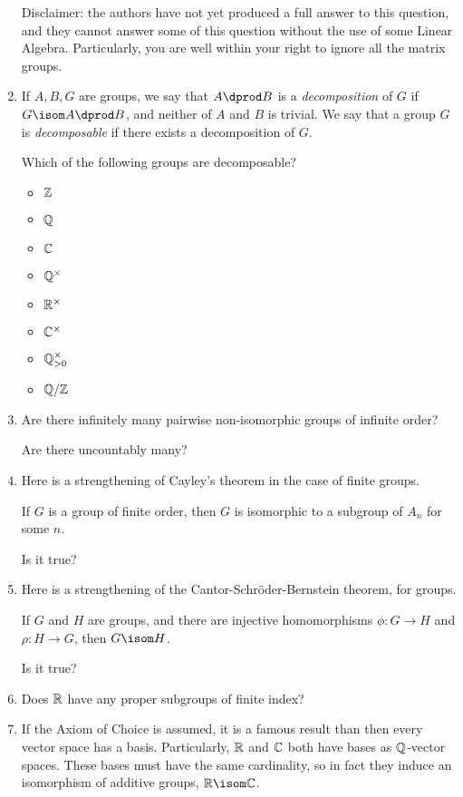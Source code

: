 \documentclass[a4paper,12pt]{article}
\begin{document}
\begin{enumerate}[leftmargin=*]
  Disclaimer: the authors have not yet produced a full answer to this question,
  and they cannot answer some of this question without the use of some Linear
  Algebra. Particularly, you are well within your right to ignore all the matrix
  groups.
 \item
  If \(A, B, G\) are groups, we say that \(A \dprod B\) is a
  \emph{decomposition} of \(G\) if \(G \isom A \dprod B\), and neither of \(A\)
  and \(B\) is trivial. We say that a group \(G\) is \emph{decomposable} if
  there exists a decomposition of \(G\).

  Which of the following groups are decomposable?
  \begin{multicols}{4}
   \begin{itemize}
    \item
     \(\mathbb Z\)
    \item
     \(\mathbb Q\)
    \item
     \(\mathbb C\)
    \item
     \(\mathbb Q^\times\)
    \item
     \(\mathbb R^\times\)
    \item
     \(\mathbb C^\times\)
    \item
     \(\mathbb Q_{>0}^\times\)
    \item
     \(\mathbb Q / \mathbb Z\)
   \end{itemize}
  \end{multicols}
 \item
  Are there infinitely many pairwise non-isomorphic groups of infinite order?

  Are there uncountably many?
 \item
  Here is a strengthening of Cayley's theorem in the case of finite groups.
  \begin{tcolorbox}
   If \(G\) is a group of finite order, then \(G\) is isomorphic to a subgroup
   of \(A_n\) for some \(n\).
  \end{tcolorbox}
  Is it true?
 \item
  Here is a strengthening of the Cantor-Schr\"oder-Bernstein theorem, for
  groups.
  \begin{tcolorbox}
   If \(G\) and \(H\) are groups, and there are injective homomorphisms
   \(\phi: G \to H\) and \(\rho: H \to G\), then \(G \isom H\).
  \end{tcolorbox}
  Is it true?
 \item
  Does \(\mathbb R\) have any proper subgroups of finite index?
 \item
  If the Axiom of Choice is assumed, it is a famous result than then every
  vector space has a basis. Particularly, \(\mathbb R\) and \(\mathbb C\) both have bases as
  \(\mathbb Q\)-vector spaces. These bases must have the same cardinality, so in fact
  they induce an isomorphism of additive groups, \(\R \isom \C\).


\end{enumerate}
\end{document}
